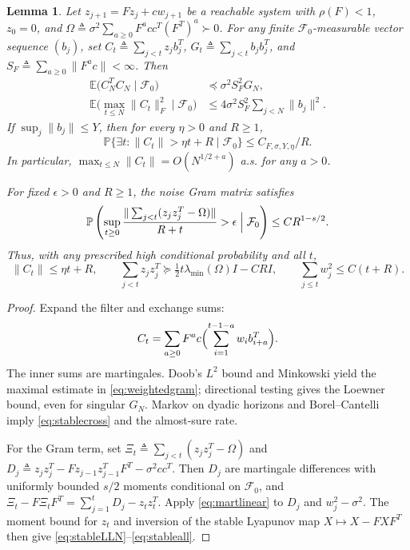 \documentclass[11pt,reqno]{amsart}
\numberwithin{equation}{section}
\newtheorem{lemma}[theorem]{Lemma}
\theoremstyle{definition}
\theoremstyle{remark}
\newcommand{\E}{\mathbb E}
\newcommand{\Prob}{\mathbb P}
\newcommand{\F}{\mathcal F}
\begin{document}
\begin{lemma}\label{lem:stable}
Let $z_{j+1}=Fz_j+cw_{j+1}$ be a reachable system with
$\rho(F)<1$, $z_0=0$, and
$\Omega\triangleq\sigma^2\sum_{a\ge0}F^acc^T(F^T)^a\succ0$.
For any finite $\F_0$-measurable vector sequence $(b_j)$, set
$C_t\triangleq\sum_{j<t}z_jb_j^T$, $G_t\triangleq\sum_{j<t}b_jb_j^T$, and
$S_F\triangleq\sum_{a\ge0}\|F^ac\|<\infty$. Then
\begin{equation}\label{eq:weightedgram}
 \begin{aligned}
 \E\bigl(C_N^T C_N\mid\F_0\bigr)&\preceq\sigma^2S_F^2G_N,\\
 \E\bigl(\max_{t\le N}\|C_t\|_F^2\mid\F_0\bigr)
 &\le4\sigma^2S_F^2\sum_{j<N}\|b_j\|^2.
 \end{aligned}
\end{equation}
If $\sup_j\|b_j\|\le Y$, then for every $\eta>0$ and $R\ge1$,
\begin{equation}\label{eq:stablecross}
 \Prob\{\exists t:\|C_t\|>\eta t+R\mid\F_0\}
 \le C_{F,\sigma,Y,\eta}/R.
\end{equation}
In particular, $\max_{t\le N}\|C_t\|=O(N^{1/2+a})$ a.s. for any $a>0$.

For fixed $\epsilon>0$ and $R\ge1$, the noise Gram matrix satisfies
\begin{equation}\label{eq:stableLLN}
 \Prob\left(\sup_{t\ge0}
 \frac{\|\sum_{j<t}(z_jz_j^T-\Omega)\|}{R+t}>\epsilon
 \Bigm|\F_0\right)\le CR^{1-s/2}.
\end{equation}
Thus, with any prescribed high conditional probability and all $t$,
\begin{equation}\label{eq:stableall}
 \|C_t\|\le\eta t+R,\qquad
 \sum_{j<t}z_jz_j^T\succeq\tfrac12t\lambda_{\min}(\Omega)I-CRI,\qquad
 \sum_{j\le t}w_j^2\le C(t+R).
\end{equation}
\end{lemma}
\begin{proof}
Expand the filter and exchange sums:
\[
 C_t=\sum_{a\ge0}F^ac\Bigl(\sum_{i=1}^{t-1-a}w_i b_{i+a}^T\Bigr).
\]
The inner sums are martingales. Doob's $L^2$ bound and Minkowski yield the maximal estimate in \eqref{eq:weightedgram}; directional testing gives the Loewner bound, even for singular $G_N$. Markov on dyadic horizons and Borel--Cantelli imply \eqref{eq:stablecross} and the almost-sure rate.

For the Gram term, set
$\Xi_t\triangleq\sum_{j<t}(z_jz_j^T-\Omega)$ and
$D_j\triangleq z_jz_j^T-Fz_{j-1}z_{j-1}^T F^T-\sigma^2cc^T$.
Then $D_j$ are martingale differences with uniformly bounded $s/2$ moments conditional on $\F_0$, and
$\Xi_t-F\Xi_tF^T=\sum_{j=1}^tD_j-z_tz_t^T$.
Apply \eqref{eq:martlinear} to $D_j$ and $w_j^2-\sigma^2$. The moment bound for $z_t$ and inversion of the stable Lyapunov map $X\mapsto X-FXF^T$ then give \eqref{eq:stableLLN}--\eqref{eq:stableall}.
\end{proof}
\end{document}
